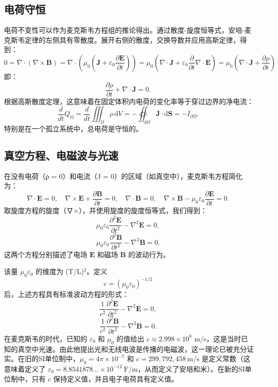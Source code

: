 \subsection{电荷守恒}
电荷不变性可以作为麦克斯韦方程组的推论得出。通过散度-旋度恒等式，安培-麦克斯韦定律的左侧具有零散度。展开右侧的散度，交换导数并应用高斯定律，得到：
\[ 0 = \nabla \cdot (\nabla \times \mathbf{B}) = \nabla \cdot \left(\mu_{0} \left(\mathbf{J} + \varepsilon_{0} \frac{\partial \mathbf{E}}{\partial t}\right)\right) = \mu_{0} \left(\nabla \cdot \mathbf{J} + \varepsilon_{0} \frac{\partial}{\partial t} \nabla \cdot \mathbf{E}\right) = \mu_{0} \left(\nabla \cdot \mathbf{J} + \frac{\partial \rho}{\partial t}\right)~\]
即：
\[
\frac{\partial \rho}{\partial t} + \nabla \cdot \mathbf{J} = 0.~
\]
根据高斯散度定理，这意味着在固定体积内电荷的变化率等于穿过边界的净电流：
\[
\frac{d}{dt} Q_{\Omega} = \frac{d}{dt} \iiint_{\Omega} \rho \, \mathrm{d} V = -\oiint_{\partial \Omega} \mathbf{J} \cdot \mathrm{d} \mathbf{S} = -I_{\partial \Omega}.~
\]
特别是在一个孤立系统中，总电荷是守恒的。
\subsection{真空方程、电磁波与光速}  
在没有电荷（ρ = 0）和电流（J = 0）的区域（如真空中），麦克斯韦方程简化为：
\[
\nabla \cdot \mathbf{E} = 0, \quad \nabla \times \mathbf{E} + \frac{\partial \mathbf{B}}{\partial t} = 0, \quad \nabla \cdot \mathbf{B} = 0, \quad \nabla \times \mathbf{B} - \mu_0 \varepsilon_0 \frac{\partial \mathbf{E}}{\partial t} = 0.~
\]
取旋度方程的旋度（∇×），并使用旋度的旋度恒等式，我们得到：
\[
\mu_0 \varepsilon_0 \frac{\partial^2 \mathbf{E}}{\partial t^2} - \nabla^2 \mathbf{E} = 0,~
\]
\[
\mu_0 \varepsilon_0 \frac{\partial^2 \mathbf{B}}{\partial t^2} - \nabla^2 \mathbf{B} = 0.~
\]
这两个方程分别描述了电场 \(\mathbf{E}\) 和磁场 \(\mathbf{B}\) 的波动行为。

该量 \(\mu_0 \varepsilon_0\) 的维度为 (T/L)\(^2\)。定义
\[
c = (\mu_0 \varepsilon_0)^{-1/2}~
\]
后，上述方程具有标准波动方程的形式：
\[
\frac{1}{c^2} \frac{\partial^2 \mathbf{E}}{\partial t^2} - \nabla^2 \mathbf{E} = 0,~
\]
\[
\frac{1}{c^2} \frac{\partial^2 \mathbf{B}}{\partial t^2} - \nabla^2 \mathbf{B} = 0.~
\]
在麦克斯韦的时代，已知的 \(\varepsilon_0\) 和 \(\mu_0\) 的值给出 \(c \approx 2.998 \times 10^8\) m/s，这是当时已知的真空中光速。由此他提出光和无线电波是传播的电磁波，这一理论已被充分证实。在旧的SI单位制中，\(\mu_0 = 4\pi \times 10^{-7}\) 和 \(c = 299,792,458~\text{m/s}\) 是定义常数（这意味着定义了 \(\varepsilon_0 = 8.8541878... \times 10^{-12}~\text{F/m}\)，从而定义了安培和米）。在新的SI单位制中，只有 \(c\) 保持定义值，并且电子电荷具有定义值。